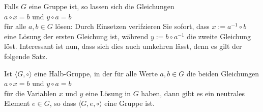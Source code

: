 \noindent
Falls $G$ eine Gruppe ist, so lassen sich die Gleichungen
\\[0.2cm]
\hspace*{1.3cm}
$a \circ x = b$ \quad und \quad $y \circ a = b$
\\[0.2cm]
f\"{u}r alle $a,b \in G$ l\"{o}sen: Durch Einsetzen verifzieren Sie sofort, dass $x := a^{-1} \circ b$
eine L\"{o}sung der ersten Gleichung ist, w\"{a}hrend $y := b \circ a^{-1}$ die zweite Gleichung l\"{o}st.
Interessant ist nun, dass sich dies auch umkehren l\"{a}sst, denn es gilt der folgende Satz.

\begin{Satz} \label{satz:solvable}
Ist $\langle G, \circ \rangle$ eine Halb-Gruppe, in der f\"{u}r alle Werte $a,b \in G$ die beiden Gleichungen 
\\[0.2cm]
\hspace*{1.3cm}
$a \circ x = b$ \quad und \quad $y \circ a = b$
\\[0.2cm]  
f\"{u}r die Variablen $x$ und $y$ eine L\"{o}sung in $G$ haben, dann
gibt es ein neutrales Element $e \in G$, so 
dass $\langle G, e, \circ \rangle$  eine Gruppe ist.
\end{Satz}

